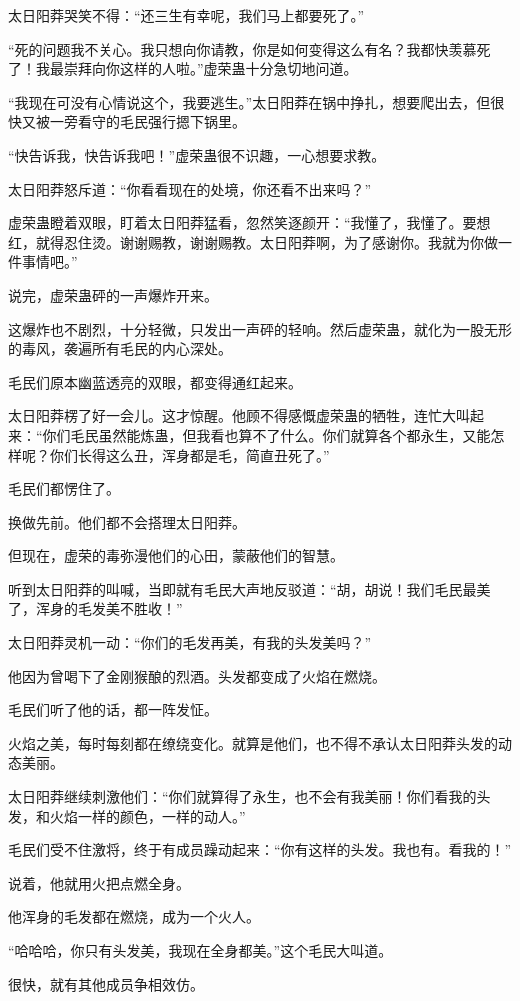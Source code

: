 \begin{this_body}
太日阳莽哭笑不得：“还三生有幸呢，我们马上都要死了。”

“死的问题我不关心。我只想向你请教，你是如何变得这么有名？我都快羡慕死了！我最崇拜向你这样的人啦。”虚荣蛊十分急切地问道。

“我现在可没有心情说这个，我要逃生。”太日阳莽在锅中挣扎，想要爬出去，但很快又被一旁看守的毛民强行摁下锅里。

“快告诉我，快告诉我吧！”虚荣蛊很不识趣，一心想要求教。

太日阳莽怒斥道：“你看看现在的处境，你还看不出来吗？”

虚荣蛊瞪着双眼，盯着太日阳莽猛看，忽然笑逐颜开：“我懂了，我懂了。要想红，就得忍住烫。谢谢赐教，谢谢赐教。太日阳莽啊，为了感谢你。我就为你做一件事情吧。”

说完，虚荣蛊砰的一声爆炸开来。

这爆炸也不剧烈，十分轻微，只发出一声砰的轻响。然后虚荣蛊，就化为一股无形的毒风，袭遍所有毛民的内心深处。

毛民们原本幽蓝透亮的双眼，都变得通红起来。

太日阳莽楞了好一会儿。这才惊醒。他顾不得感慨虚荣蛊的牺牲，连忙大叫起来：“你们毛民虽然能炼蛊，但我看也算不了什么。你们就算各个都永生，又能怎样呢？你们长得这么丑，浑身都是毛，简直丑死了。”

毛民们都愣住了。

换做先前。他们都不会搭理太日阳莽。

但现在，虚荣的毒弥漫他们的心田，蒙蔽他们的智慧。

听到太日阳莽的叫喊，当即就有毛民大声地反驳道：“胡，胡说！我们毛民最美了，浑身的毛发美不胜收！”

太日阳莽灵机一动：“你们的毛发再美，有我的头发美吗？”

他因为曾喝下了金刚猴酿的烈酒。头发都变成了火焰在燃烧。

毛民们听了他的话，都一阵发怔。

火焰之美，每时每刻都在缭绕变化。就算是他们，也不得不承认太日阳莽头发的动态美丽。

太日阳莽继续刺激他们：“你们就算得了永生，也不会有我美丽！你们看我的头发，和火焰一样的颜色，一样的动人。”

毛民们受不住激将，终于有成员躁动起来：“你有这样的头发。我也有。看我的！”

说着，他就用火把点燃全身。

他浑身的毛发都在燃烧，成为一个火人。

“哈哈哈，你只有头发美，我现在全身都美。”这个毛民大叫道。

很快，就有其他成员争相效仿。


\end{this_body}
